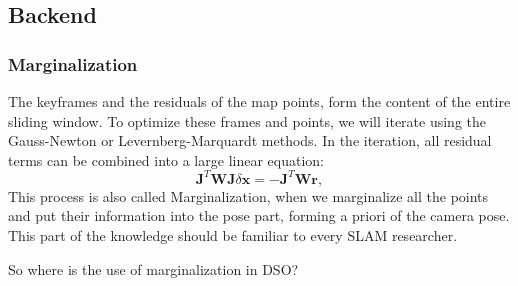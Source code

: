 \documentclass[a4paper,10pt]{article}
\begin{document}
	\subsection{Backend}
	\subsubsection{Marginalization}
	The keyframes and the residuals of the map points, form the content of the entire sliding window. To optimize these frames and points, we will iterate using the Gauss-Newton or Levernberg-Marquardt methods. In the iteration, all residual terms can be combined into a large linear equation:\textbf{\textbf{\textbf{}}}
	\begin{equation}
	\mathbf{J}^T \mathbf{W} \mathbf{J} \delta \mathbf{x}=-\mathbf{J}^T \mathbf{W} \mathbf{r},
	\end{equation}
	This process is also called Marginalization, when we marginalize all the points and put their information into the pose part, forming a priori of the camera pose. This part of the knowledge should be familiar to every SLAM researcher.
	
	So where is the use of marginalization in DSO?
	
\end{document}
